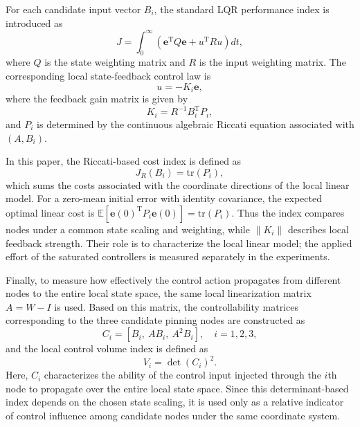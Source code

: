\documentclass[a4paper,fleqn]{cas-dc}
\theoremstyle{plain}
\theoremstyle{definition}
\begin{document}
For each candidate input vector $B_i$, the standard LQR performance index is introduced as
\begin{equation}
	J
	=
	\int_{0}^{\infty}
	\left(
	\mathbf{e}^{\mathrm T}Q\mathbf{e}
	+
	u^{\mathrm T}Ru
	\right)dt,
	\label{eq:lqr_cost}
\end{equation}
where $Q$ is the state weighting matrix and $R$ is the input weighting matrix. The corresponding local state-feedback control law is
\begin{equation}
	u=-K_i\mathbf{e},
	\label{eq:lqr_control}
\end{equation}
where the feedback gain matrix is given by
\begin{equation}
	K_i=R^{-1}B_i^{\mathrm T}P_i,
	\label{eq:lqr_gain}
\end{equation}
and $P_i$ is determined by the continuous algebraic Riccati equation associated with $(A,B_i)$.

In this paper, the Riccati-based cost index is defined as
\begin{equation}
	J_R(B_i)=\mathrm{tr}(P_i),
	\label{eq:riccati_cost_index}
\end{equation}
which sums the costs associated with the coordinate directions of the local linear model. For a zero-mean initial error with identity covariance, the expected optimal linear cost is $\mathbb{E}[\mathbf e(0)^{\mathrm T}P_i\mathbf e(0)]=\mathrm{tr}(P_i)$. Thus the index compares nodes under a common state scaling and weighting, while $\|K_i\|$ describes local feedback strength. Their role is to characterize the local linear model; the applied effort of the saturated controllers is measured separately in the experiments.

Finally, to measure how effectively the control action propagates from different nodes to the entire local state space, the same local linearization matrix $A=W-I$ is used. Based on this matrix, the controllability matrices corresponding to the three candidate pinning nodes are constructed as~\cite{kailath1980linear}
\begin{equation}
	C_i=
	\left[
	B_i,\ AB_i,\ A^2B_i
	\right],
	\quad i=1,2,3,
	\label{eq:controllability_matrices}
\end{equation}
and the local control volume index is defined as
\begin{equation}
	V_i=\det(C_i)^2.
	\label{eq:control_volume}
\end{equation}
Here, $C_i$ characterizes the ability of the control input injected through the $i$th node to propagate over the entire local state space. Since this determinant-based index depends on the chosen state scaling, it is used only as a relative indicator of control influence among candidate nodes under the same coordinate system.
\end{document}
